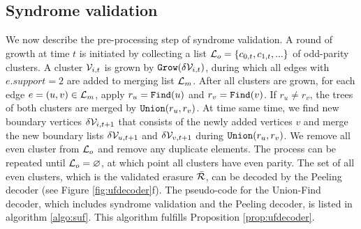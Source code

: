 \begin{algorithm}[htb]
  \BlankLine
  \BlankLine

  \BlankLine
  \caption{}\label{algo:ufgrow}
\end{algorithm}

\subsection{Syndrome validation}
We now describe the pre-processing step of syndrome validation. A round of growth at time $t$ is initiated by collecting a list $\mathcal{L}_o = \{c_{0,t}, c_{1,t}, ...\}$ of odd-parity clusters. A cluster $\mathcal{V}_{i,t}$ is grown by $\texttt{Grow}(\delta \mathcal{V}_{i,t})$, during which all edges with $e.support=2$ are added to merging list $\mathcal{L}_m$. After all clusters are grown, for each edge $e=(u,v) \in \mathcal{L}_m$, apply $r_u=\texttt{Find}(u)$ and $r_v=\texttt{Find}(v)$. If $r_u\neq r_v$, the trees of both clusters are merged by $\texttt{Union}(r_u,r_v)$. At time same time, we find new boundary vertices $\delta \mathcal{V}_{i,t+1}$ that consists of the newly added vertices $v$ and merge the new boundary lists $\delta \mathcal{V}_{u,t+1}$ and $\delta \mathcal{V}_{v,t+1}$ during $\texttt{Union}(r_u,r_v)$. We remove all even cluster from $\mathcal{L}_o$ and remove any duplicate elements. The process can be repeated until $\mathcal{L}_o=\varnothing$, at which point all clusters have even parity. The set of all even clusters, which is the validated erasure $\bar{\mathcal{R}}$, can be decoded by the Peeling decoder (see Figure \ref{fig:ufdecoder}f). The pseudo-code for the Union-Find decoder, which includes syndrome validation and the Peeling decoder, is listed in algorithm \ref{algo:suf}. This algorithm fulfills Proposition \ref{prop:ufdecoder}.



